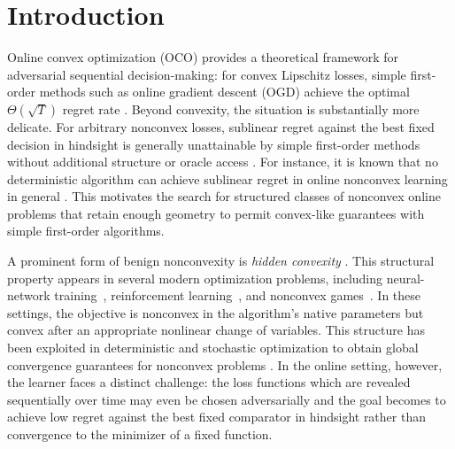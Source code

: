 \documentclass[a4paper,11pt,fullpage]{article}
\theoremstyle{plain}
\theoremstyle{definition}
\theoremstyle{plain}
\begin{document}
\section{Introduction}

Online convex optimization (OCO) provides a theoretical framework for adversarial sequential decision-making: for convex Lipschitz losses, simple first-order methods such as online gradient descent (OGD) achieve the optimal $\Theta(\sqrt{T})$ regret rate \citep{zinkevich03,hazan16oco,shalev-shwartz12oco-ftml}.
Beyond convexity, the situation is substantially more delicate. 
For arbitrary nonconvex losses, sublinear regret against the best fixed decision in hindsight is generally unattainable by simple first-order methods without additional structure or oracle access \citep{krichene-et-al15hedge-continuum,agarwal-gonen-hazan19,suggala-netrapalli20,heliou-et-al20}. For instance, it is known that no deterministic algorithm can achieve sublinear regret in online nonconvex learning in general \citep[Proposition~3]{suggala-netrapalli20}. 
This motivates the search for structured classes of nonconvex online problems that retain enough geometry to permit convex-like guarantees with simple first-order algorithms.

A prominent form of benign nonconvexity is \textit{hidden convexity} \citep{bental-teboulle96hidden-cvx,li-et-al05hidden-cvx-min,fatkhullin-he-hu25stoch-hidden-cv,levin-kileel-boumal25,gorissen-et-al26hidden-cvx}. 
This structural property appears in several modern optimization problems, including neural-network training~\citep{wang-et-al22iclr,patelsolving,ergen-pilanci25,zeger-pilanci26}, reinforcement learning~\citep{hazan-et-al19,zhang-et-al20variational,zahavy-et-al21,barakat-et-al23rlgu,barakat-et-al25rlgu,dorazio2025solving}, and nonconvex games~\citep{vlatakis2019poincare,mladenovic-et-al22hidden,sakos2023exploiting,kalogiannis2024learning,gemp-et-al25cmg,kalogiannis-et-al25zs-cmg,barakat-et-al26gumg}. In these settings, the objective is nonconvex in the algorithm’s native parameters but convex after an appropriate nonlinear change of variables. 
This structure has been exploited in deterministic and stochastic optimization to obtain global convergence guarantees for nonconvex problems \citep{chen-et-al25,fatkhullin-he-hu25stoch-hidden-cv,fatkhullin-et-al25constrained-hidden-cv,bhaskara-et-al25}. 
In the online setting, however, the learner faces a distinct challenge: the loss functions which are revealed sequentially over time may even be chosen adversarially and the goal becomes to achieve low regret against the best fixed comparator in hindsight rather than convergence to the minimizer of a fixed function.\\
\end{document}
